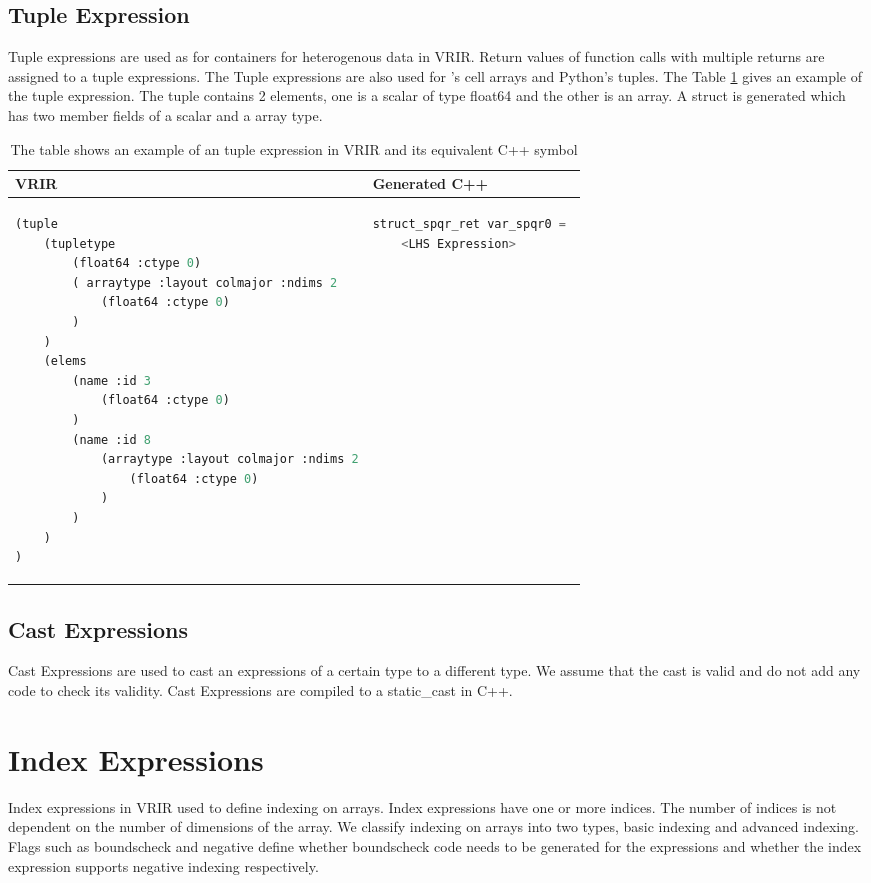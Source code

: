\subsection{Tuple Expression}
Tuple expressions are used as for containers for heterogenous data in VRIR. Return values of function calls with multiple returns are assigned to a tuple expressions. The Tuple expressions are also used for \matlab's cell arrays and Python's tuples. The Table \ref{tab:tupleExpr} gives an example of the tuple expression. The tuple contains 2 elements, one is a scalar of type \textsf{float64} and the other is an array. A struct is generated which has two member fields of a scalar and a array type. 
\begin{table}[htbp]
\centering
\begin{tabular}{|l|l|}
\hline

VRIR &  Generated C++ \\
\hline
{
\begin{lstlisting}[language=lisp,frame=none, numbers=none]
(tuple
	(tupletype
		(float64 :ctype 0)
		( arraytype :layout colmajor :ndims 2
			(float64 :ctype 0)
		)
	)
	(elems
		(name :id 3
			(float64 :ctype 0)
		)
		(name :id 8
			(arraytype :layout colmajor :ndims 2
				(float64 :ctype 0)
			)
		)
	)
)
\end{lstlisting}
}
&
{
\begin{lstlisting}[language=c,frame=none, numbers=none]
struct_spqr_ret var_spqr0 = 
	<LHS Expression>
\end{lstlisting}
} \\
\hline
\end{tabular}
\caption[Tuple Expression example]{The table shows an example of an tuple expression in VRIR and its equivalent C++ symbol}
\label{tab:tupleExpr}
\end{table}
\subsection{Cast Expressions}
Cast Expressions are used to cast an expressions of a certain type to a different type. We assume that the cast is valid and do not add any code to check its validity. Cast Expressions are compiled to a static\_cast in C++.

\section{Index Expressions}
Index expressions in VRIR used to define indexing on arrays. Index expressions have one or more indices. The number of indices is not dependent on the number of dimensions of the array. We classify indexing on arrays into two types, basic indexing and advanced indexing. Flags such as boundscheck and negative define whether boundscheck code needs to be generated for the expressions and whether the index expression supports negative indexing respectively.

